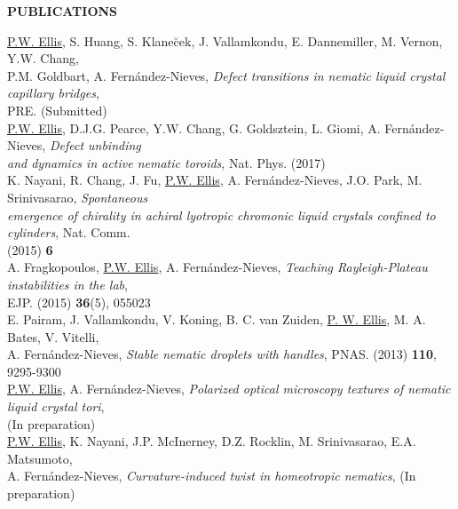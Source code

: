 \documentclass[10pt]{article}
\newenvironment{changemargin}[2]{%
  \list{}{\rightmargin#2\leftmargin#1
    \parsep=0pt\topsep=1pt\partopsep=0pt}
\item[]} {\endlist}
\newenvironment{indentmore}{\begin{changemargin}{10pt}{0cm}}{\end{changemargin}}
\begin{document}
\textbf{\large PUBLICATIONS}
\begin{indentmore}
\underline{P.W. Ellis}, S. Huang, S. Klane\u{c}ek, J. Vallamkondu, E. Dannemiller, M. Vernon, Y.W. Chang, \\ \hspace*{15pt} P.M. Goldbart, A. Fern\'{a}ndez-Nieves, \emph{Defect transitions in nematic liquid crystal capillary bridges},\\ \hspace*{15pt} PRE. (Submitted)\\

\underline{P.W. Ellis}, D.J.G. Pearce, Y.W. Chang, G. Goldsztein, L. Giomi, A. Fern\'{a}ndez-Nieves, \emph{Defect unbinding \\ \hspace*{15pt} and dynamics in active nematic toroids}, Nat. Phys. (2017) \\

K. Nayani, R. Chang, J. Fu, \underline{P.W. Ellis}, A. Fern\'{a}ndez-Nieves, J.O. Park, M. Srinivasarao, \emph{Spontaneous \\ \hspace*{15pt} emergence of chirality in achiral lyotropic chromonic liquid crystals confined to cylinders}, Nat. Comm. \\ \hspace*{15pt}  (2015) {\bf 6} \\

A. Fragkopoulos, \underline{P.W. Ellis}, A. Fern\'{a}ndez-Nieves, \emph{Teaching Rayleigh-Plateau instabilities in the lab}, \\ \hspace*{15pt}EJP. (2015) {\bf 36}(5), 055023 \\

E. Pairam, J. Vallamkondu, V. Koning, B. C. van Zuiden, \underline{P. W. Ellis}, M. A. Bates, V. Vitelli, \\ \hspace*{15pt}A. Fern\'{a}ndez-Nieves, \emph{Stable nematic droplets with handles}, PNAS. (2013) {\bf 110}, 9295-9300\\

\underline{P.W. Ellis}, A. Fern\'{a}ndez-Nieves, \emph{Polarized optical microscopy textures of nematic liquid crystal tori}, \\ \hspace*{15pt} (In preparation)\\

\underline{P.W. Ellis}, K. Nayani, J.P. McInerney, D.Z. Rocklin, M. Srinivasarao, E.A. Matsumoto, \\ \hspace*{15pt} A. Fern\'{a}ndez-Nieves, \emph{Curvature-induced twist in homeotropic nematics}, (In preparation)\\


\end{indentmore}
\end{document}
